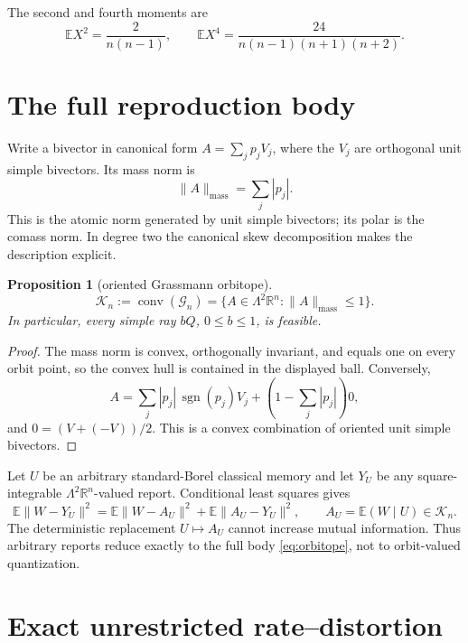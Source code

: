 \documentclass[11pt,a4paper]{article}
\newtheorem{proposition}[theorem]{Proposition}
\newcommand{\G}{\mathcal G}
\newcommand{\K}{\mathcal K}
\newcommand{\E}{\mathbb E}
\newcommand{\R}{\mathbb R}
\DeclareMathOperator{\conv}{conv}
\begin{document}
The second and fourth moments are
\begin{equation}\label{eq:lowmoments}
 \E X^2=\frac{2}{n(n-1)},\qquad
 \E X^4=\frac{24}{n(n-1)(n+1)(n+2)}.
\end{equation}

\section{The full reproduction body}

Write a bivector in canonical form $A=\sum_jp_jV_j$, where the $V_j$ are orthogonal unit simple bivectors.  Its mass norm is
\[
 \|A\|_{\mathrm{mass}}=\sum_j|p_j|.
\]
This is the atomic norm generated by unit simple bivectors; its polar is the comass norm.  In degree two the canonical skew decomposition makes the description explicit.

\begin{proposition}[oriented Grassmann orbitope]\label{prop:orbitope}
\begin{equation}\label{eq:orbitope}
 \K_n:=\conv(\G_n)=\{A\in\Lambda^2\R^n:\|A\|_{\mathrm{mass}}\le1\}.
\end{equation}
In particular, every simple ray $bQ$, $0\le b\le1$, is feasible.
\end{proposition}

\begin{proof}
The mass norm is convex, orthogonally invariant, and equals one on every orbit point, so the convex hull is contained in the displayed ball.  Conversely,
\[
 A=\sum_j|p_j|\,\operatorname{sgn}(p_j)V_j
 +\left(1-\sum_j|p_j|\right)0,
\]
and $0=(V+(-V))/2$.  This is a convex combination of oriented unit simple bivectors.
\end{proof}

Let $U$ be an arbitrary standard-Borel classical memory and let $Y_U$ be any square-integrable $\Lambda^2\R^n$-valued report.  Conditional least squares gives
\begin{equation}\label{eq:pythagoras}
 \E\|W-Y_U\|^2
 =\E\|W-A_U\|^2+\E\|A_U-Y_U\|^2,
 \qquad A_U=\E(W\mid U)\in\K_n.
\end{equation}
The deterministic replacement $U\mapsto A_U$ cannot increase mutual information.  Thus arbitrary reports reduce exactly to the full body \cref{eq:orbitope}, not to orbit-valued quantization.

\section{Exact unrestricted rate--distortion}
\end{document}
